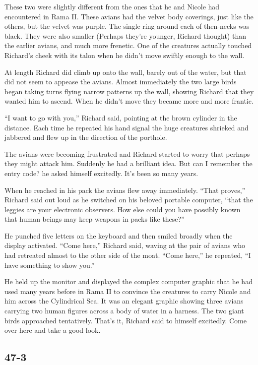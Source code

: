 \documentclass[]{article}
\begin{document}
{These two were slightly different from the ones that he and Nicole had encountered in Rama II. These avians had the velvet body coverings, just like the others, but the velvet was purple. The single ring around each of then-necks was black. They were also smaller (Perhaps they’re younger, Richard thought) than the earlier avians, and much more frenetic. One of the creatures actually touched Richard’s cheek with its talon when he didn’t move swiftly enough to the wall.

At length Richard did climb up onto the wall, barely out of the water, but that did not seem to appease the avians. Almost immediately the two large birds began taking turns flying narrow patterns up the wall, showing Richard that they wanted him to ascend. When he didn’t move they became more and more frantic.

“I want to go with you,” Richard said, pointing at the brown cylinder in the distance. Each time he repeated his hand signal the huge creatures shrieked and jabbered and flew up in the direction of the porthole.

The avians were becoming frustrated and Richard started to worry that perhaps they might attack him. Suddenly he had a brilliant idea. But can I remember the entry code? he asked himself excitedly. It’s been so many years.

When he reached in his pack the avians flew away immediately. “That proves,” Richard said out loud as he switched on his beloved portable computer, “that the leggies are your electronic observers. How else could you have possibly known that human beings may keep weapons in packs like these?”

He punched five letters on the keyboard and then smiled broadly when the display activated. “Come here,” Richard said, waving at the pair of avians who had retreated almost to the other side of the moat. “Come here,” he repeated, “I have something to show you.”

He held up the monitor and displayed the complex computer graphic that he had used many years before in Rama II to convince the creatures to carry Nicole and him across the Cylindrical Sea. It was an elegant graphic showing three avians carrying two human figures across a body of water in a harness. The two giant birds approached tentatively. That’s it, Richard said to himself excitedly. Come over here and take a good look.


\subsection{47-3}

}
\end{document}
